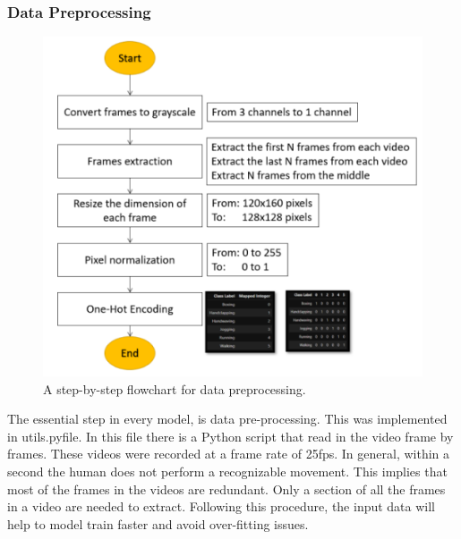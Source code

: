 \subsubsection{Data Preprocessing}
\begin{figure}[ht]
\centering
\includegraphics{Figures/dp}
\decoRule
\caption[A step-by-step flowchart for data preprocessing.]{A step-by-step flowchart for data preprocessing.}
\label{fig:la}
\end{figure}
The essential step in every model, is data pre-processing. This was implemented in utils.pyfile. In this file there is a Python script that read in the video frame by frames. These videos were recorded at a frame rate of 25fps. In general, within a second the human does not perform a recognizable movement. This implies that most of the frames in the videos are redundant. Only a section of all the frames in a video are needed to extract. Following this procedure, the input data will help to model train faster and avoid over-fitting issues.\\

